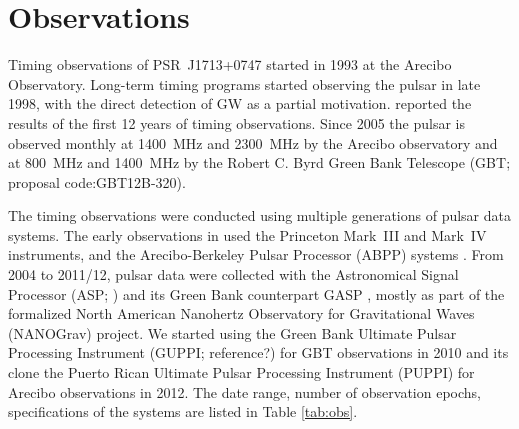 \section{Observations}
Timing observations of PSR~J1713+0747 started in 1993 at the Arecibo
Observatory. Long-term timing programs started observing the pulsar in
late 1998, with the direct detection of GW as a partial
motivation. \citet{sns+05} reported the results of the first 12 years
of timing observations. Since 2005 the pulsar is observed monthly
at 1400~MHz and 2300~MHz by the Arecibo
observatory and at 800~MHz and 1400~MHz by the Robert C. Byrd Green Bank
Telescope (GBT; proposal code:GBT12B-320).

The timing observations were conducted 
using multiple generations of pulsar data systems. The early 
observations in \citet{sns+05} used
 the Princeton Mark~III \citep{skn+92} and Mark~IV
\citep{sst+00} instruments, and the Arecibo-Berkeley Pulsar Processor
(ABPP) systems \citep{bdz+97}. 
From 2004 to 2011/12, pulsar data were collected with the Astronomical Signal
Processor (ASP; \citealt{dem07}) and its Green Bank counterpart GASP \citep{dem07},
mostly as part of the formalized North American Nanohertz Observatory
for Gravitational Waves (NANOGrav) project. We
started using 
the Green Bank Ultimate Pulsar Processing Instrument (GUPPI; reference?) for GBT 
observations in 2010 and its clone the Puerto Rican Ultimate Pulsar Processing Instrument
(PUPPI) for Arecibo observations in 2012. 
The date range, number of observation epochs, specifications of the
systems are listed in Table \ref{tab:obs}.


